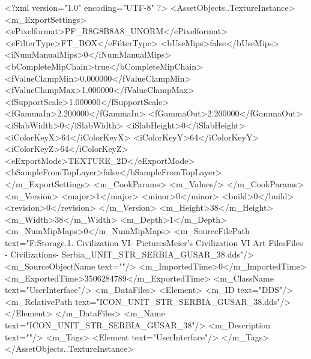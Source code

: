 <?xml version="1.0" encoding="UTF-8" ?>
<AssetObjects..TextureInstance>
	<m_ExportSettings>
		<ePixelformat>PF_R8G8B8A8_UNORM</ePixelformat>
		<eFilterType>FT_BOX</eFilterType>
		<bUseMips>false</bUseMips>
		<iNumManualMips>0</iNumManualMips>
		<bCompleteMipChain>true</bCompleteMipChain>
		<fValueClampMin>0.000000</fValueClampMin>
		<fValueClampMax>1.000000</fValueClampMax>
		<fSupportScale>1.000000</fSupportScale>
		<fGammaIn>2.200000</fGammaIn>
		<fGammaOut>2.200000</fGammaOut>
		<iSlabWidth>0</iSlabWidth>
		<iSlabHeight>0</iSlabHeight>
		<iColorKeyX>64</iColorKeyX>
		<iColorKeyY>64</iColorKeyY>
		<iColorKeyZ>64</iColorKeyZ>
		<eExportMode>TEXTURE_2D</eExportMode>
		<bSampleFromTopLayer>false</bSampleFromTopLayer>
	</m_ExportSettings>
	<m_CookParams>
		<m_Values/>
	</m_CookParams>
	<m_Version>
		<major>1</major>
		<minor>0</minor>
		<build>0</build>
		<revision>0</revision>
	</m_Version>
	<m_Height>38</m_Height>
	<m_Width>38</m_Width>
	<m_Depth>1</m_Depth>
	<m_NumMipMaps>0</m_NumMipMaps>
	<m_SourceFilePath text="F:\Mod Storage\2.1. Civilization VI\Mods\Archive - Pictures\Sid Meier's Civilization VI Art Files\Art Files - Civilizations\Civilization - Serbia\ICON_UNIT_STR_SERBIA_GUSAR_38.dds"/>
	<m_SourceObjectName text=""/>
	<m_ImportedTime>0</m_ImportedTime>
	<m_ExportedTime>3506284789</m_ExportedTime>
	<m_ClassName text="UserInterface"/>
	<m_DataFiles>
		<Element>
			<m_ID text="DDS"/>
			<m_RelativePath text="ICON_UNIT_STR_SERBIA_GUSAR_38.dds"/>
		</Element>
	</m_DataFiles>
	<m_Name text="ICON_UNIT_STR_SERBIA_GUSAR_38"/>
	<m_Description text=""/>
	<m_Tags>
		<Element text="UserInterface"/>
	</m_Tags>
</AssetObjects..TextureInstance>

